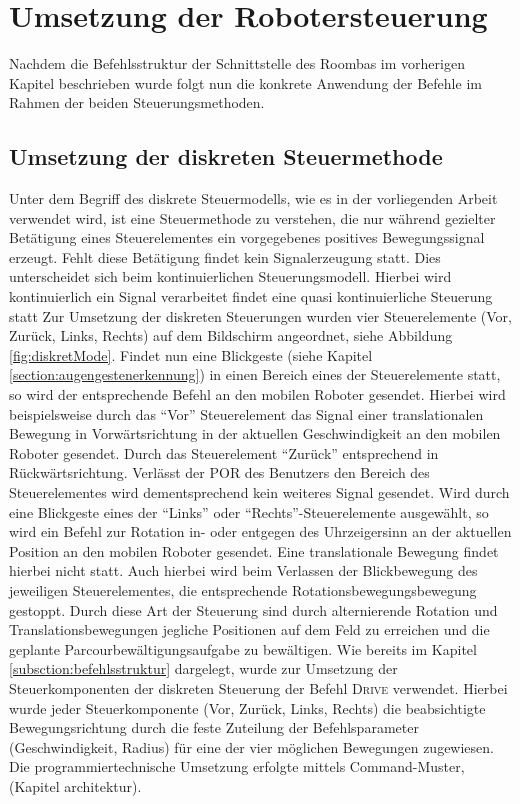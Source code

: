  
\section{Umsetzung der Robotersteuerung}

Nachdem die Befehlsstruktur der Schnittstelle des Roombas im vorherigen Kapitel beschrieben wurde folgt nun die konkrete Anwendung der Befehle im Rahmen der beiden Steuerungsmethoden. 

\subsection{Umsetzung der diskreten Steuermethode}
\label{subsection:diskSt}
Unter dem Begriff des diskrete Steuermodells, wie es in der vorliegenden Arbeit verwendet wird, ist eine Steuermethode zu verstehen, die nur während gezielter Betätigung eines Steuerelementes ein vorgegebenes positives Bewegungssignal erzeugt. Fehlt diese Betätigung findet kein Signalerzeugung statt. Dies unterscheidet sich beim kontinuierlichen Steuerungsmodell. Hierbei wird  kontinuierlich ein Signal verarbeitet findet eine quasi kontinuierliche Steuerung statt
Zur Umsetzung der diskreten Steuerungen wurden vier Steuerelemente (Vor, Zurück, Links, Rechts) auf dem Bildschirm angeordnet, siehe Abbildung \ref{fig:diskretMode}. Findet nun eine Blickgeste (siehe Kapitel \ref{section:augengestenerkennung}) in einen Bereich eines der Steuerelemente statt, so wird der entsprechende Befehl an den mobilen Roboter gesendet. Hierbei wird beispielsweise durch das \enquote{Vor} Steuerelement das Signal einer translationalen Bewegung in Vorwärtsrichtung in der aktuellen Geschwindigkeit an den mobilen Roboter gesendet. Durch das Steuerelement \enquote{Zurück} entsprechend in Rückwärtsrichtung. Verlässt der POR des Benutzers den Bereich des Steuerelementes wird dementsprechend kein weiteres Signal gesendet. Wird durch eine Blickgeste eines der \enquote{Links} oder \enquote{Rechts}-Steuerelemente ausgewählt, so wird ein Befehl zur Rotation in- oder entgegen des Uhrzeigersinn an der aktuellen Position an den mobilen Roboter gesendet. Eine translationale Bewegung findet hierbei nicht statt. Auch hierbei wird beim Verlassen der Blickbewegung des jeweiligen Steuerelementes, die entsprechende Rotationsbewegungsbewegung gestoppt. Durch diese Art der Steuerung sind durch alternierende Rotation und Translationsbewegungen jegliche Positionen auf dem Feld zu erreichen und die geplante Parcourbewältigungsaufgabe zu bewältigen. Wie bereits im Kapitel \ref{subsction:befehlsstruktur} dargelegt, wurde zur Umsetzung der Steuerkomponenten der diskreten Steuerung der Befehl \textsc{Drive} verwendet. Hierbei wurde jeder Steuerkomponente (Vor, Zurück, Links, Rechts) die beabsichtigte Bewegungsrichtung durch die feste Zuteilung der Befehlsparameter (Geschwindigkeit, Radius) für eine der vier möglichen Bewegungen zugewiesen. Die programmiertechnische Umsetzung erfolgte mittels Command-Muster, \vgl (Kapitel architektur). 

